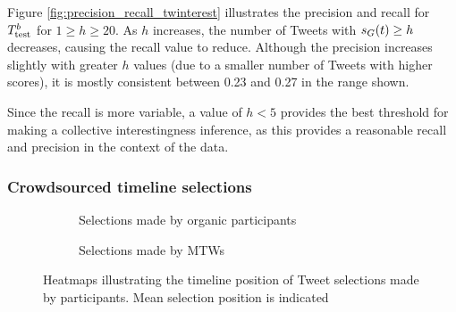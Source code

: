 Figure \ref{fig:precision_recall_twinterest} illustrates the precision and recall for $T^b_{\textrm{test}}{}$ for $1 \geq h \geq 20$. As $h$ increases, the number of Tweets with $s_G(t) \geq h$ decreases, causing the recall value to reduce. Although the precision increases slightly with greater $h$ values (due to a smaller number of Tweets with higher scores), it is mostly consistent between 0.23 and 0.27 in the range shown. 

Since the recall is more variable, a value of $h < 5$ provides the best threshold for making a collective interestingness inference, as this provides a reasonable recall and precision in the context of the data. 


\subsubsection{Crowdsourced timeline selections}

\begin{figure}[h]
\begin{subfigure}{.5\textwidth}
    \centering
    \caption{Selections made by organic participants}
\end{subfigure}
\quad
\begin{subfigure}{.5\textwidth}
    \centering
    \caption{Selections made by MTWs}
\end{subfigure}
\caption{Heatmaps illustrating the timeline position of Tweet selections made by participants. Mean selection position is indicated}
\label{fig:selection_heatmaps}
\end{figure}

